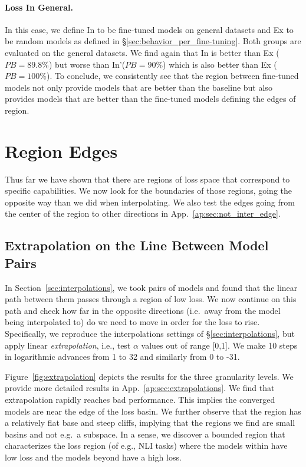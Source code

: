 \documentclass[nohyperref]{article}
\theoremstyle{plain}
\theoremstyle{definition}
\theoremstyle{remark}
\begin{document}
\paragraph{Loss In General.} In this case, we define In to be fine-tuned models on {general} datasets and Ex to be random models as defined in \S\ref{sec:behavior_per_fine-tuning}. Both groups are evaluated on the {general} datasets. 
We find again that In is better than Ex ($PB=89.8\%$) but worse than In'($PB=90\%$) which is also better than Ex ($PB=100\%$). To conclude, we consistently see that the region between fine-tuned models not only provide models that are better than the baseline but also provides models that are better than the fine-tuned models defining the edges of region.



\section{Region Edges}\label{sec:boundaries}
Thus far we have shown that there are regions of loss space that correspond to specific capabilities. We now look for the boundaries of those regions, going the opposite way than we did when interpolating.
We also test the edges going from the center of the region to other directions in App.~\ref{ap:sec:not_inter_edge}.

\subsection{Extrapolation on the Line Between Model Pairs}
In Section~\ref{sec:interpolations}, we took pairs of models and found that the linear path between them passes through a region of low loss. We now continue on this path and check how far in the opposite directions (i.e.\ away from the model being interpolated to) do we need to move in order for the loss to rise. Specifically, we reproduce the interpolations settings of \S\ref{sec:interpolations}, but apply linear \textit{extrapolation}, i.e., test $ \alpha $ values out of range [0,1]. We make 10 steps in logarithmic advances from 1 to 32 and similarly from 0 to -31.%


Figure~\ref{fig:extrapolation} depicts the results for the three granularity levels. We provide more detailed results in App.~\ref{ap:sec:extrapolations}. We find that extrapolation rapidly reaches bad performance. This implies the converged models are near the edge of the loss basin. We further observe that the region has a relatively flat base and steep cliffs, implying that the regions we find are small basins and not e.g.\ a subspace. In a sense, we discover a bounded region that characterizes the loss region (of e.g., NLI tasks) where the models within have low loss and the models beyond have a high loss.  
\end{document}
